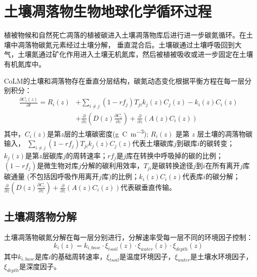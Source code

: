 \chapter{土壤凋落物生物地球化学循环过程}\label{土壤凋落物生物地球化学循环过程}

植被物候和自然死亡凋落的植被碳进入土壤凋落物库后进行进一步碳氮循环。在土壤中凋落物碳氮元素经过土壤分解，
垂直混合后。土壤碳通过土壤呼吸回到大气，土壤氮通过矿化作用进入土壤无机氮库，然后被植被吸收或进一步固定在土壤有机氮库中。

CoLM的土壤和凋落物存在垂直分层结构，碳氮动态变化根据平衡方程在每一层分别积分：
\begin{equation}
\begin{aligned}
\frac{\partial C_{i}(z)}{\partial t}=R_{i}(z) &+\sum_{i \neq j}\left(1-r f_{j}\right) T_{j i} k_{j}(z) C_{j}(z)-k_{i}(z) C_{i}(z) \\
&+\frac{\partial}{\partial z}\left(D(z) \frac{\partial C_{i}}{\partial z}\right)+\frac{\partial}{\partial z}\left(A(z) C_{i}(z)\right)
\end{aligned}
\end{equation}
其中，$C_i\left(z\right)$是第$z$层的土壤碳密度(\unit{g.C.m^{-3}}); $R_i (z)$ 是第 $z$ 层土壤的凋落物碳输入，
$\sum_{i\neq j}{\left(1-{rf}_j\right)T_{ji}k_j\left(z\right)C_j\left(z\right)}$代表土壤碳库$j$到碳库$i$的碳转变；
$k_j\left(z\right)$是第$z$层碳库$j$的周转速率；${rf}_j$是$j$库在转换中呼吸掉的碳的比例；
$\left(1-{rf}_j\right)$是微生物对库$j$分解的碳利用效率，$T_{ji}$是碳转换途径$j$到$i$在所有离开$j$库碳通量
(不包括因呼吸作用离开$j$库)的比例；$k_i\left(z\right)C_i\left(z\right)$代表库$i$的碳分解；
$\frac{\partial}{\partial z}\left(D\left(z\right)\frac{\partial C_i}{\partial z}\right)+\frac{\partial}{\partial z}\left(A\left(z\right)C_i\left(z\right)\right)$代表碳垂直传输。


\section{土壤凋落物分解}\label{土壤凋落物分解}
土壤凋落物碳氮分解在每一层分别进行，分解速率受每一层不同的环境因子控制：
\begin{equation}
k_{i}(z)=k_{i,base} \cdot \xi_{tsoil}(z) \cdot \xi_{water}(z) \cdot \xi_{depth}(z)
\end{equation}
其中$k_{i,base}$是库$i$的基础周转速率，$\xi_{tsoil}$是温度环境因子，$\xi_{water}$是土壤水环境因子，$\xi_{depth}$是深度因子。


